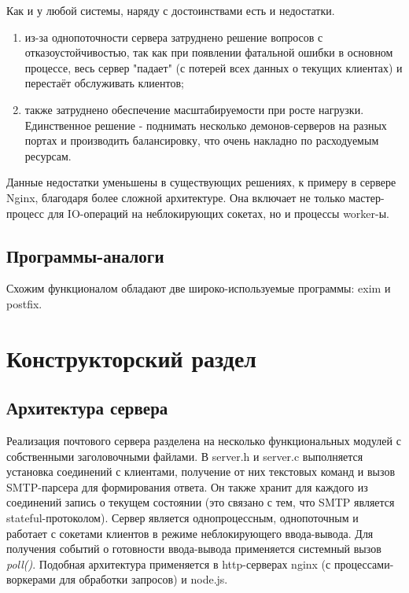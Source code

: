 \documentclass[a4paper,12pt]{report}
\begin{document}
Как и у любой системы, наряду с достоинствами есть и недостатки.
\begin{enumerate}
    \item из-за однопоточности сервера затруднено решение вопросов с отказоустойчивостью, так как при появлении фатальной ошибки в основном процессе, весь сервер "падает" (с потерей всех данных о текущих клиентах) и перестаёт обслуживать клиентов;
    \item также затруднено обеспечение масштабируемости при росте нагрузки. Единственное решение - поднимать несколько демонов-серверов на разных портах и производить балансировку, что очень накладно по расходуемым ресурсам.
\end{enumerate}

Данные недостатки уменьшены в существующих решениях, к примеру в сервере Nginx, благодаря более сложной архитектуре. Она включает не только мастер-процесс для IO-операций на неблокирующих сокетах, но и процессы worker-ы.


\section{Программы-аналоги}

Схожим функционалом обладают две широко-используемые программы: exim и postfix.


\chapter{Конструкторский раздел}

\section{Архитектура сервера}

Реализация почтового сервера разделена на несколько функциональных модулей с собственными заголовочными файлами. В server.h и server.c выполняется установка соединений с клиентами, получение от них текстовых команд и вызов SMTP-парсера для формирования ответа. Он также хранит для каждого из соединений запись о текущем состоянии (это связано с тем, что SMTP является stateful-протоколом). Сервер является однопроцессным, однопоточным и работает с сокетами клиентов в режиме неблокирующего ввода-вывода. Для получения событий о готовности ввода-вывода применяется системный вызов \textit{poll()}. Подобная архитектура применяется в http-серверах nginx (с процессами-воркерами для обработки запросов) и node.js.
\end{document}
